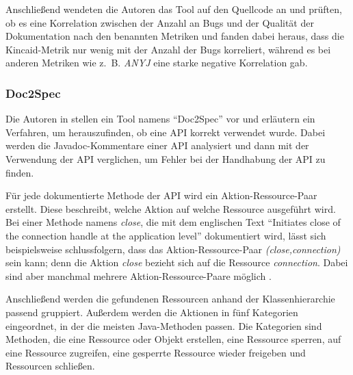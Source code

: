 Anschließend wendeten die Autoren das Tool auf den Quellcode an und prüften, ob es eine Korrelation zwischen der Anzahl an Bugs und der Qualität der Dokumentation nach den benannten Metriken und fanden dabei heraus, dass die Kincaid-Metrik nur wenig mit der Anzahl der Bugs korreliert, während es bei anderen Metriken wie z.~B. \textit{ANYJ} eine starke negative Korrelation gab. 

\subsubsection{Doc2Spec}
Die Autoren in \cite[S. 307ff.]{InferringResourceSpecificationsfromNaturalLanguageAPIDocumentation} stellen ein Tool namens \enquote{Doc2Spec} vor und erläutern ein Verfahren, um herauszufinden, ob eine API korrekt verwendet wurde. Dabei werden die Javadoc-Kommentare einer API analysiert und dann mit der Verwendung der API verglichen, um Fehler bei der Handhabung der API zu finden. 

Für jede dokumentierte Methode der API wird ein Aktion-Ressource-Paar erstellt. Diese beschreibt, welche Aktion auf welche Ressource ausgeführt wird. Bei einer Methode namens \textit{close}, die mit dem englischen Text \enquote{Initiates close of the connection handle at the
application level} dokumentiert wird, lässt sich beispielsweise schlussfolgern, dass das Aktion-Ressource-Paar \textit{(close,connection)} sein kann; denn die Aktion \textit{close} bezieht sich auf die Ressource \textit{connection}. Dabei sind aber manchmal mehrere Aktion-Ressource-Paare möglich \cite[S. 308]{InferringResourceSpecificationsfromNaturalLanguageAPIDocumentation}.

Anschließend werden die gefundenen Ressourcen anhand der Klassenhierarchie passend gruppiert. Außerdem werden die Aktionen in fünf Kategorien eingeordnet, in der die meisten Java-Methoden passen. Die Kategorien sind Methoden, die eine Ressource oder Objekt erstellen, eine Ressource sperren, auf eine Ressource zugreifen, eine gesperrte Ressource wieder freigeben und Ressourcen schließen. 

